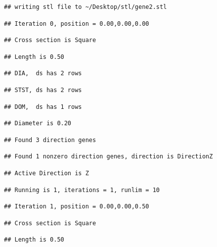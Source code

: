 \documentclass[]{article}
\begin{document}
\begin{verbatim}
## writing stl file to ~/Desktop/stl/gene2.stl
\end{verbatim}

\begin{verbatim}
## Iteration 0, position = 0.00,0.00,0.00
\end{verbatim}

\begin{verbatim}
## Cross section is Square
\end{verbatim}

\begin{verbatim}
## Length is 0.50
\end{verbatim}

\begin{verbatim}
## DIA,  ds has 2 rows
\end{verbatim}

\begin{verbatim}
## STST, ds has 2 rows
\end{verbatim}

\begin{verbatim}
## DOM,  ds has 1 rows
\end{verbatim}

\begin{verbatim}
## Diameter is 0.20
\end{verbatim}

\begin{verbatim}
## Found 3 direction genes
\end{verbatim}

\begin{verbatim}
## Found 1 nonzero direction genes, direction is DirectionZ
\end{verbatim}

\begin{verbatim}
## Active Direction is Z
\end{verbatim}

\begin{verbatim}
## Running is 1, iterations = 1, runlim = 10
\end{verbatim}

\begin{verbatim}
## Iteration 1, position = 0.00,0.00,0.50
\end{verbatim}

\begin{verbatim}
## Cross section is Square
\end{verbatim}

\begin{verbatim}
## Length is 0.50
\end{verbatim}
\end{document}
